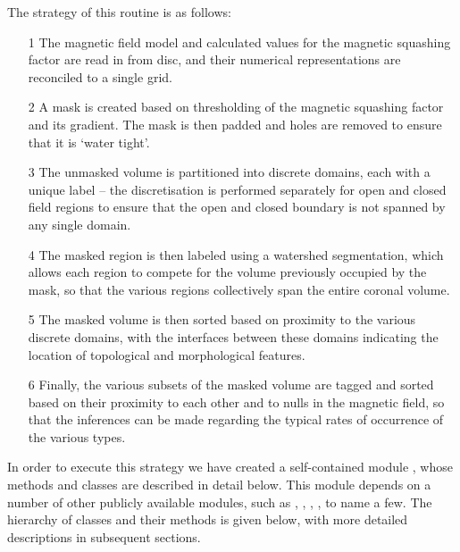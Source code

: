 \documentclass[10pt]{aastex62}
\begin{document}
The strategy of this routine is as follows:
\begin{itemize}
\item[1]{The magnetic field model and calculated values for the magnetic squashing factor are read in from disc, and their numerical representations are reconciled to a single grid.}
\item[2]{A mask is created based on thresholding of the magnetic squashing factor and its gradient. The mask is then padded and holes are removed to ensure that it is `water tight'.}
\item[3]{The unmasked volume is partitioned into discrete domains, each with a unique label -- the discretisation is performed separately for open and closed field regions to ensure that the open and closed boundary is not spanned by any single domain.}
\item[4]{The masked region is then labeled using a watershed segmentation, which allows each region to compete for the volume previously occupied by the mask, so that the various regions collectively span the entire coronal volume.}
\item[5]{The masked volume is then sorted based on proximity to the various discrete domains, with the interfaces between these domains indicating the location of topological and morphological features.}
\item[6]{Finally, the various subsets of the masked volume are tagged and sorted based on their proximity to each other and to nulls in the magnetic field, so that the inferences can be made regarding the typical rates of occurrence of the various types.}
\end{itemize}

In order to execute this strategy we have created a self-contained  module , whose methods and classes are described in detail below.
This module depends on a number of other publicly available  modules, such as ,  \citep{SciPy},  \citep{scikit-image}, , to name a few.
The hierarchy of classes and their methods is given below, with more detailed descriptions in subsequent sections.
\end{document}

